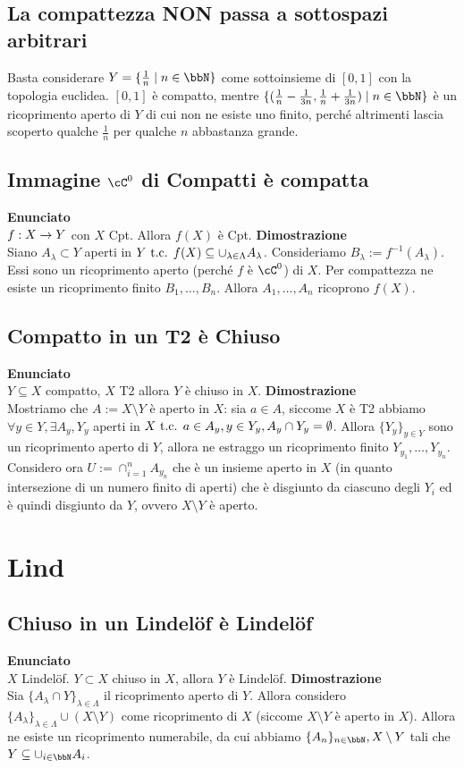 \documentclass[a4paper,11pt,NoNotes,GeneralMath]{stdmdoc}
\newcommand{\Enunciato}{\vskip 0.05cm \noindent \textbf{Enunciato} \\ }
\renewcommand{\Dimostrazione}{\vskip 0.05cm \noindent \textbf{Dimostrazione} \\ }
\begin{document}
	\subsection*{La compattezza NON passa a sottospazi arbitrari}
	Basta considerare $Y = \{\frac{1}{n} \mid n \in \bbN\}$ come sottoinsieme di $[0,1]$ con la topologia euclidea. $[0,1]$ è compatto, mentre $\{ (\frac{1}{n} - \frac{1}{3n}, \frac{1}{n} + \frac{1}{3n}) \mid n \in \bbN \}$ è un ricoprimento aperto di $Y$ di cui non ne esiste uno finito, perché altrimenti lascia scoperto qualche $\frac{1}{n}$ per qualche $n$ abbastanza grande.

	\subsection*{Immagine $\cC^0$ di Compatti è compatta}
	\Enunciato $f: X \rightarrow Y$ con $X$ Cpt. Allora $f(X)$ è Cpt.
	\Dimostrazione Siano $A_\lambda \subset Y$ aperti in $Y \mbox{ t.c. } f(X) \subseteq \cup_{\lambda \in \Lambda} A_\lambda$. Consideriamo $B_\lambda := f^{-1}(A_\lambda)$. Essi sono un ricoprimento aperto (perché $f$ è $\cC^0$) di $X$. Per compattezza ne esiste un ricoprimento finito $B_1, \ldots, B_n$. Allora $A_1, \ldots, A_n$ ricoprono $f(X)$.

	\subsection*{Compatto in un T2 è Chiuso}
	\Enunciato $Y \subseteq X$ compatto, $X$ T2 allora $Y$ è chiuso in $X$.
	\Dimostrazione Mostriamo che $A := X \setminus Y$ è aperto in $X$: sia $a \in A$, siccome $X$ è T2 abbiamo $\forall y \in Y, \exists A_y, Y_y$ aperti in $X \mbox{ t.c. } a \in A_y, y \in Y_y, A_y \cap Y_y = \emptyset$. Allora $\{Y_y\}_{y \in Y}$ sono un ricoprimento aperto di $Y$, allora ne estraggo un ricoprimento finito $Y_{y_1}, \ldots, Y_{y_n}$. Considero ora $U := \cap_{i=1}^{n} A_{y_n}$ che è un insieme aperto in $X$ (in quanto intersezione di un numero finito di aperti) che è disgiunto da ciascuno degli $Y_i$ ed è quindi disgiunto da $Y$, ovvero $X \setminus Y$ è aperto.

	\section*{Lind}
	\subsection*{Chiuso in un Lindel\"of è Lindel\"of}
	\Enunciato $X$ Lindel\"of. $Y \subset X$ chiuso in $X$, allora $Y$ è Lindel\"of.
	\Dimostrazione Sia $\{A_\lambda \cap Y\}_{\lambda \in \Lambda}$ il ricoprimento aperto di $Y$. Allora considero $\{A_\lambda\}_{\lambda \in \Lambda} \cup (X \setminus Y)$ come ricoprimento di $X$ (siccome $X \setminus Y$ è aperto in $X$). Allora ne esiste un ricoprimento numerabile, da cui abbiamo $\{A_n\}_{n \in \bbN}, X \setminus Y$ tali che $Y \subseteq \cup_{i \in \bbN} A_i$.
\end{document}
